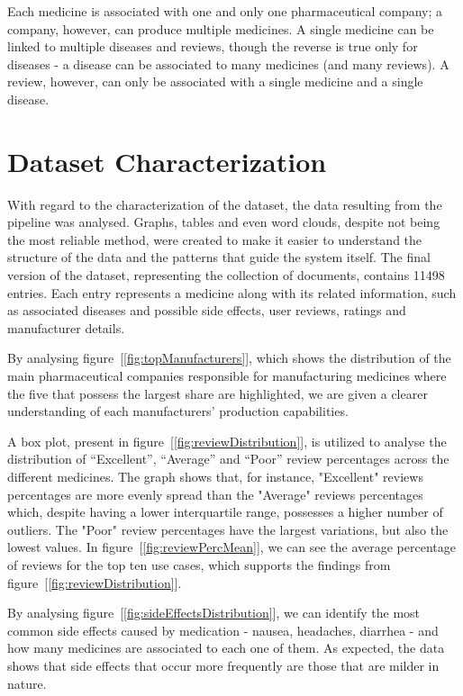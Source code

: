 \documentclass[sigconf]{acmart}
\begin{document}
Each medicine is associated with one and only one pharmaceutical company; a company, however, can produce multiple medicines. A single medicine can be linked to multiple diseases and reviews, though the reverse is true only for diseases - a disease can be associated to many medicines (and many reviews). A review, however, can only be associated with a single medicine and a single disease.

\section{Dataset Characterization}

With regard to the characterization of the dataset, the data resulting from the pipeline was analysed. Graphs, tables and even word clouds, despite not being the most reliable method, were created to make it easier to understand the structure of the data and the patterns that guide the system itself.
The final version of the dataset, representing the collection of documents, contains 11498 entries. Each entry represents a medicine along with its related information, such as associated diseases and possible side effects, user reviews, ratings and manufacturer details.

By analysing figure~[\ref{fig:topManufacturers}], which shows the distribution of the main pharmaceutical companies responsible for manufacturing medicines where the five that possess the largest share are highlighted, we are given a clearer understanding of each manufacturers' production capabilities.

A box plot, present in figure~[\ref{fig:reviewDistribution}], is utilized to analyse the distribution of “Excellent”, “Average” and “Poor” review percentages across the different medicines. The graph shows that, for instance, "Excellent" reviews percentages are more evenly spread than the "Average" reviews percentages which, despite having a lower interquartile range\cite{iqrange}, possesses a higher number of outliers. The "Poor" review percentages have the largest variations, but also the lowest values.
In figure~[\ref{fig:reviewPercMean}], we can see the average percentage of reviews for the top ten use cases, which supports the findings from figure~[\ref{fig:reviewDistribution}].

By analysing figure~[\ref{fig:sideEffectsDistribution}], we can identify the most common side effects caused by medication - nausea, headaches, diarrhea - and how many medicines are associated to each one of them. As expected, the data shows that side effects that occur more frequently are those that are milder in nature.
\end{document}
